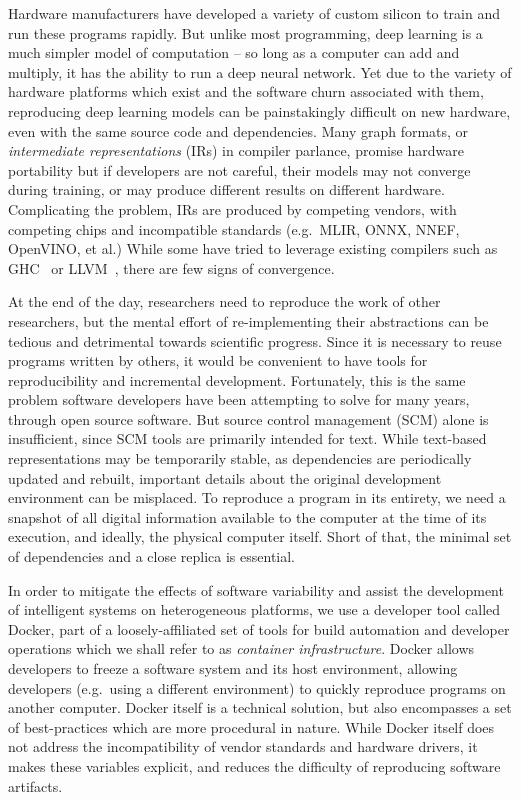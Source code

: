 \documentclass[12pt,initial,twoside,maitrise]{dms}
\numberwithin{equation}{section}
\numberwithin{table}{chapter}
\numberwithin{figure}{chapter}
\begin{document}
Hardware manufacturers have developed a variety of custom silicon to train and run these programs rapidly. But unlike most programming, deep learning is a much simpler model of computation -- so long as a computer can add and multiply, it has the ability to run a deep neural network. Yet due to the variety of hardware platforms which exist and the software churn associated with them, reproducing deep learning models can be painstakingly difficult on new hardware, even with the same source code and dependencies. Many graph formats, or \textit{intermediate representations} (IRs) in compiler parlance, promise hardware portability but if developers are not careful, their models may not converge during training, or may produce different results on different hardware. Complicating the problem, IRs are produced by competing vendors, with competing chips and incompatible standards (e.g.~MLIR, ONNX, NNEF, OpenVINO, et al.) While some have tried to leverage existing compilers such as GHC~\citep{elliott2018simple} or LLVM~\citep{wei2017dlvm}, there are few signs of convergence.

At the end of the day, researchers need to reproduce the work of other researchers, but the mental effort of re-implementing their abstractions can be tedious and detrimental towards scientific progress. Since it is necessary to reuse programs written by others, it would be convenient to have tools for reproducibility and incremental development. Fortunately, this is the same problem software developers have been attempting to solve for many years, through open source software. But source control management (SCM) alone is insufficient, since SCM tools are primarily intended for text. While text-based representations may be temporarily stable, as dependencies are periodically updated and rebuilt, important details about the original development environment can be misplaced. To reproduce a program in its entirety, we need a snapshot of all digital information available to the computer at the time of its execution, and ideally, the physical computer itself. Short of that, the minimal set of dependencies and a close replica is essential.

In order to mitigate the effects of software variability and assist the development of intelligent systems on heterogeneous platforms, we use a developer tool called Docker, part of a loosely-affiliated set of tools for build automation and developer operations which we shall refer to as \textit{container infrastructure}. Docker allows developers to freeze a software system and its host environment, allowing developers (e.g.~using a different environment) to quickly reproduce programs on another computer. Docker itself is a technical solution, but also encompasses a set of best-practices which are more procedural in nature. While Docker itself does not address the incompatibility of vendor standards and hardware drivers, it makes these variables explicit, and reduces the difficulty of reproducing software artifacts.
\end{document}
